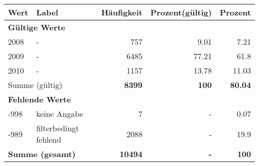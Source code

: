      \begin{longtable}{lXrrr}
     \toprule
     \textbf{Wert} & \textbf{Label} & \textbf{Häufigkeit} & \textbf{Prozent(gültig)} & \textbf{Prozent} \\
     \endhead
     \midrule
     \multicolumn{5}{l}{\textbf{Gültige Werte}}\\

     2008 &
     \multicolumn{1}{X}{ -  } &


       \num{757} &
       \num[round-mode=places,round-precision=2]{9.01} &
         \num[round-mode=places,round-precision=2]{7.21} \\

     2009 &
     \multicolumn{1}{X}{ -  } &


       \num{6485} &
       \num[round-mode=places,round-precision=2]{77.21} &
         \num[round-mode=places,round-precision=2]{61.8} \\

     2010 &
     \multicolumn{1}{X}{ -  } &


       \num{1157} &
       \num[round-mode=places,round-precision=2]{13.78} &
         \num[round-mode=places,round-precision=2]{11.03} \\
     \midrule
     \multicolumn{2}{l}{Summe (gültig)} &
       \textbf{\num{8399}} &
     \textbf{\num{100}} &
       \textbf{\num[round-mode=places,round-precision=2]{80.04}} \\
     \multicolumn{5}{l}{\textbf{Fehlende Werte}}\\
       -998 &
       keine Angabe &
         \num{7} &
        - &
         \num[round-mode=places,round-precision=2]{0.07} \\
       -989 &
       filterbedingt fehlend &
         \num{2088} &
        - &
         \num[round-mode=places,round-precision=2]{19.9} \\
     \midrule
     \multicolumn{2}{l}{\textbf{Summe (gesamt)}} &
          \textbf{\num{10494}} &
        \textbf{-} &
        \textbf{\num{100}} \\
     \bottomrule
     \end{longtable}
     
